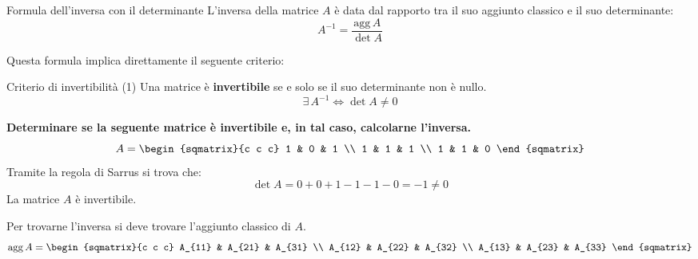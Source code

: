 \begin{teo}{Formula dell'inversa con il determinante}
    L'inversa della matrice $A$ è data dal rapporto tra il suo aggiunto classico e il suo determinante:
    \[
        A^{-1} = \frac{\text{agg}\,A}{\det A}
    \]
\end{teo}
Questa formula implica direttamente il seguente criterio:
\begin{teo}{Criterio di invertibilità (1)}
    Una matrice è \textbf{invertibile} se e solo se il suo determinante non è nullo.
    \[
        \exists\,A^{-1} \iff \det A \neq 0
    \]
\end{teo}
\begin{esempio}
    \textbf{Determinare se la seguente matrice è invertibile e, in tal caso, calcolarne l'inversa.}
    \[
        A =
        \begin{sqmatrix}{c c c}
            1 & 0 & 1 \\
            1 & 1 & 1 \\
            1 & 1 & 0
        \end{sqmatrix}
    \]
    Tramite la regola di Sarrus si trova che:
    \[
        \det A = 0 + 0 + 1 - 1 - 1 - 0 = -1 \neq 0
    \]
    La matrice $A$ è invertibile.

    Per trovarne l'inversa si deve trovare l'aggiunto classico di $A$.
    \[
        \text{agg}\,A =
        \begin{sqmatrix}{c c c}
            A_{11} & A_{21} & A_{31} \\
            A_{12} & A_{22} & A_{32} \\
            A_{13} & A_{23} & A_{33}
        \end{sqmatrix}
    \]
    

\end{esempio}
